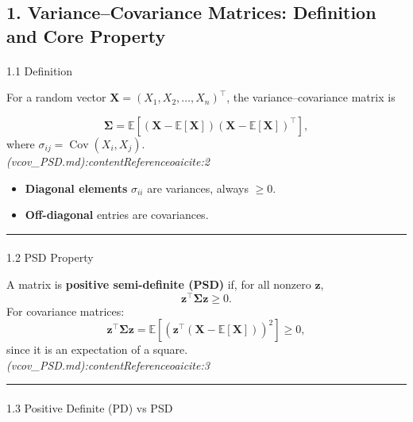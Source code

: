 \documentclass[
  letterpaper,
  DIV=11,
  numbers=noendperiod]{scrartcl}
\makeatletter
\let\oldparagraph\paragraph
\renewcommand{\paragraph}{
    \@ifstar
      \xxxParagraphStar
      \xxxParagraphNoStar
  }
\newcommand{\xxxParagraphStar}[1]{\oldparagraph*{#1}\mbox{}}
\newcommand{\xxxParagraphNoStar}[1]{\oldparagraph{#1}\mbox{}}
\providecommand{\tightlist}{%
  \setlength{\itemsep}{0pt}\setlength{\parskip}{0pt}}
\theoremstyle{remark}
\makeatother
\begin{document}
\subsection{1. Variance--Covariance Matrices: Definition and Core
Property}\label{variancecovariance-matrices-definition-and-core-property}

\paragraph{1.1 Definition}\label{definition}

For a random vector \(\mathbf{X} = (X_1, X_2, \dots, X_n)^\top\), the
variance--covariance matrix is

\[
\mathbf{\Sigma} = \mathbb{E} \left[ (\mathbf{X} - \mathbb{E}[\mathbf{X}]) (\mathbf{X} - \mathbb{E}[\mathbf{X}])^\top \right],
\] where \(\sigma_{ij} = \operatorname{Cov}(X_i, X_j)\).\\
\emph{(vcov\_PSD.md):contentReference{oaicite:2}}

\begin{itemize}
\tightlist
\item
  \textbf{Diagonal elements} \(\sigma_{ii}\) are variances, always
  \(\ge 0\).
\item
  \textbf{Off-diagonal} entries are covariances.
\end{itemize}

\begin{center}\rule{0.5\linewidth}{0.5pt}\end{center}

\paragraph{1.2 PSD Property}\label{psd-property}

A matrix is \textbf{positive semi-definite (PSD)} if, for all nonzero
\(\mathbf{z}\), \[
\mathbf{z}^\top \mathbf{\Sigma} \mathbf{z} \ge 0.
\] For covariance matrices: \[
\mathbf{z}^\top \mathbf{\Sigma} \mathbf{z}
= \mathbb{E}\!\left[(\mathbf{z}^\top (\mathbf{X} - \mathbb{E}[\mathbf{X}]))^2\right] \ge 0,
\] since it is an expectation of a square.\\
\emph{(vcov\_PSD.md):contentReference{oaicite:3}}

\begin{center}\rule{0.5\linewidth}{0.5pt}\end{center}

\paragraph{1.3 Positive Definite (PD) vs
PSD}\label{positive-definite-pd-vs-psd}
\end{document}

